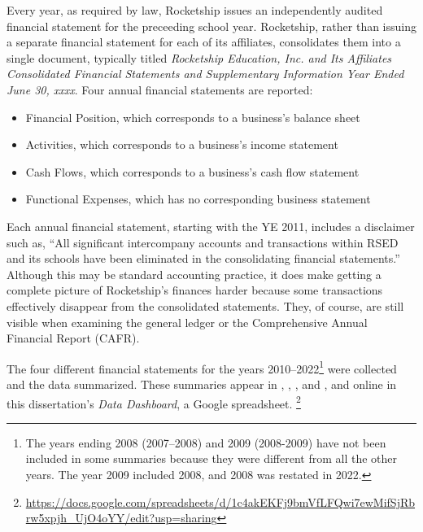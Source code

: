 Every year, as required by law, Rocketship issues an independently audited financial statement for the preceeding school year. Rocketship, rather than issuing a separate financial statement for each of its affiliates, consolidates them into a single document, typically titled \emph{Rocketship Education, Inc. and Its Affiliates Consolidated Financial Statements and Supplementary Information Year Ended June 30, xxxx}. Four annual financial statements are reported:

\begin{itemize}
  \item Financial Position, which corresponds to a business's balance sheet\\
  \item Activities, which corresponds to a business's income statement\\
  \item Cash Flows, which corresponds to a business's cash flow statement\\
  \item Functional Expenses, which has no corresponding business statement\\
\end{itemize}

Each annual financial statement, starting with the YE 2011, includes a disclaimer such as, ``All significant intercompany accounts and transactions within RSED and its schools have been eliminated in the consolidating financial statements.'' Although this may be standard accounting practice, it does make getting a complete picture of Rocketship's finances harder because some transactions effectively disappear from the consolidated statements. They, of course, are still visible when examining the general ledger or the Comprehensive Annual Financial Report (CAFR).

The four different financial statements for the years 2010–2022\footnote{The years ending 2008 (2007–2008) and 2009 (2008-2009) have not been included in some summaries because they were different from all the other years. The year 2009 included 2008, and 2008 was restated in 2022.} were collected and the data summarized. These summaries appear in , , , and , and online in this dissertation's \textit{Data Dashboard}, a Google spreadsheet.%
\footnote{\url{https://docs.google.com/spreadsheets/d/1c4akEKFj9bmVfLFQwi7ewMifSjRbrw5xpjh_UjO4oYY/edit?usp=sharing}}

